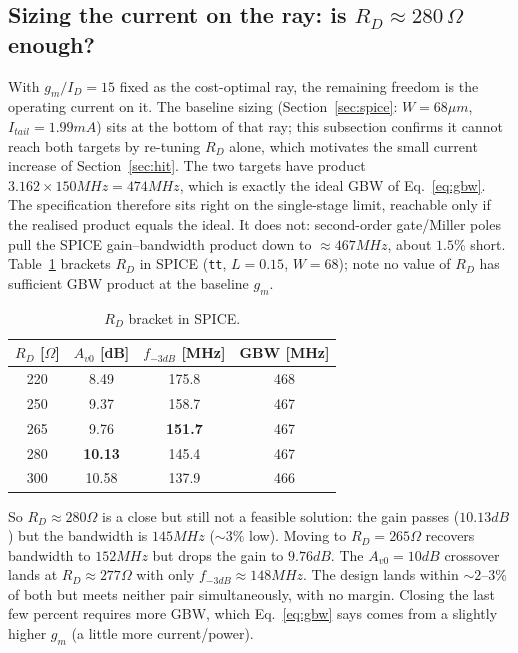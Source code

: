 \documentclass{article}
\begin{document}
\subsection{Sizing the current on the ray: is $R_D\approx280\,\Omega$ enough?}
\label{sec:rdbracket}
With $g_m/I_D=15$ fixed as the cost-optimal ray, the remaining freedom is the operating
current on it. The baseline sizing (Section~\ref{sec:spice}: $W=68\mu m$,
$I_{tail}=1.99mA$) sits at the bottom of that ray; this subsection confirms it cannot
reach both targets by re-tuning $R_D$ alone, which motivates the small current increase
of Section~\ref{sec:hit}.
The two targets have product $3.162\times150MHz=474MHz$, which is exactly the ideal
GBW of Eq.~\eqref{eq:gbw}. The specification therefore sits right on the
single-stage limit, reachable only if the realised product equals the ideal. It does
not: second-order gate/Miller poles pull the SPICE gain--bandwidth product down to
$\approx467MHz$, about $1.5\%$ short. Table~\ref{tab:rdbracket} brackets $R_D$ in SPICE
(\texttt{tt}, $L=0.15$, $W=68$); note no value of $R_D$ has sufficient GBW product at the baseline $g_m$.

\begin{table}[H]
    \centering
    \caption{$R_D$ bracket in SPICE.}
    \label{tab:rdbracket}
    \begin{tabular}{c|c|c|c} \hline
        $R_D$ [$\Omega$] & $A_{v0}$ [dB] & $f_{-3dB}$ [MHz] & GBW [MHz] \\ \hline
        220 & 8.49  & 175.8 & 468 \\ \hline
        250 & 9.37  & 158.7 & 467 \\ \hline
        265 & 9.76  & \textbf{151.7} & 467 \\ \hline
        280 & \textbf{10.13} & 145.4 & 467 \\ \hline
        300 & 10.58 & 137.9 & 466 \\ \hline
    \end{tabular}
\end{table}

So $R_D\approx280\Omega$ is a close but still not a feasible solution: the gain
passes ($10.13dB$) but the bandwidth is $145MHz$ ($\sim3\%$ low). Moving to
$R_D=265\Omega$ recovers bandwidth to $152MHz$ but drops the gain to $9.76dB$. The $A_{v0}=10dB$
crossover lands at $R_D\approx277\Omega$ with only $f_{-3dB}\approx148MHz$. The design
lands within $\sim2$--$3\%$ of both but meets neither pair simultaneously, with no margin.
Closing the last few percent requires more GBW, which Eq.~\eqref{eq:gbw} says comes from
a slightly higher $g_m$ (a little more current/power).
\end{document}
